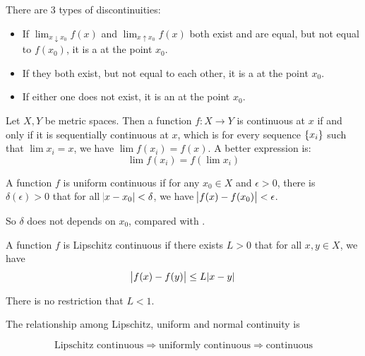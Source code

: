 \begin{definition}
    There are 3 types of discontinuities:
    \begin{itemize}
        \item If $\lim_{x \downarrow x_0} f(x)$ and $\lim_{x \uparrow x_0} f(x)$ both exist and are equal, but not equal to $f(x_0)$, it is a  at the point $x_0$.
        \item If they both exist, but not equal to each other, it is a  at the point $x_0$.
        \item If either one does not exist, it is an  at the point $x_0$.
    \end{itemize}
\end{definition}


\begin{theorem}
    Let $X,Y$ be metric spaces. Then a function $f: X\rightarrow Y$ is continuous at $x$ if and only if it is sequentially continuous at $x$, which is for every sequence $\set{x_i}$ such that $\lim x_i = x$, we have $\lim f(x_i) = f(x)$. A better expression is:
    \begin{equation}
        \lim f(x_i) = f(\lim x_i )
    \end{equation}
\end{theorem}



\begin{definition}
    A function $f$ is uniform continuous if for any $x_0 \in X$ and $\epsilon > 0$, there is $\delta(\epsilon) > 0$ that for all $\abs{x - x_0} < \delta$, we have $\abs{f(x) - f(x_0)} < \epsilon$.
    
    So $\delta$ does not depends on $x_0$, compared with .
\end{definition}

\begin{definition}
    A function $f$ is Lipschitz continuous if there exists $L > 0$ that for all $x,y \in X$, we have 
    \begin{equation}
        \abs{f(x) - f(y)} \leq L \abs{x - y}
    \end{equation}
    
    There is no restriction that $L < 1$.
\end{definition}

\begin{theorem}
    The relationship among Lipschitz, uniform and normal continuity is
    
    \begin{equation}
        \text{Lipschitz continuous} \Rightarrow \text{uniformly continuous} \Rightarrow \text{continuous}
    \end{equation}    
\end{theorem}


